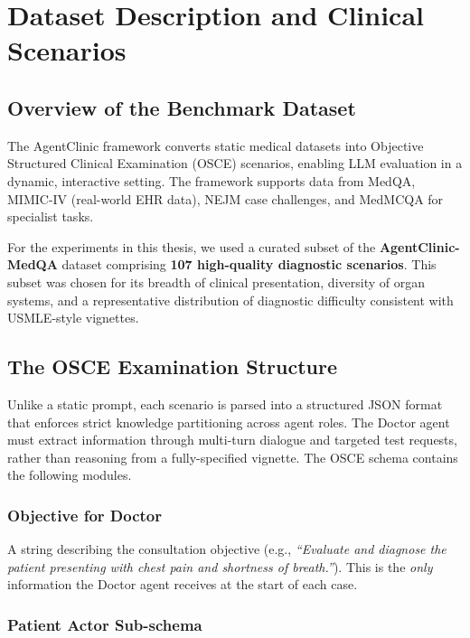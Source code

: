 \chapter{Dataset Description and Clinical Scenarios}
\label{Chapter3}

\section{Overview of the Benchmark Dataset}

The AgentClinic framework converts static medical datasets into Objective Structured Clinical Examination (OSCE) scenarios, enabling LLM evaluation in a dynamic, interactive setting. The framework supports data from MedQA, MIMIC-IV (real-world EHR data), NEJM case challenges, and MedMCQA for specialist tasks.

For the experiments in this thesis, we used a curated subset of the \textbf{AgentClinic-MedQA} dataset comprising \textbf{107 high-quality diagnostic scenarios}. This subset was chosen for its breadth of clinical presentation, diversity of organ systems, and a representative distribution of diagnostic difficulty consistent with USMLE-style vignettes.

\section{The OSCE Examination Structure}

Unlike a static prompt, each scenario is parsed into a structured JSON format that enforces strict knowledge partitioning across agent roles. The Doctor agent must extract information through multi-turn dialogue and targeted test requests, rather than reasoning from a fully-specified vignette. The OSCE schema contains the following modules.

\subsection{Objective for Doctor}

A string describing the consultation objective (e.g., \textit{``Evaluate and diagnose the patient presenting with chest pain and shortness of breath.''}). This is the \textit{only} information the Doctor agent receives at the start of each case.

\subsection{Patient Actor Sub-schema}

